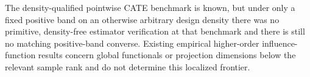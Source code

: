 The density-qualified pointwise CATE benchmark is known, but under only a fixed positive band on an otherwise arbitrary design density there was no primitive, density-free estimator verification at that benchmark and there is still no matching positive-band converse.  Existing empirical higher-order influence-function results concern global functionals or projection dimensions below the relevant sample rank and do not determine this localized frontier.